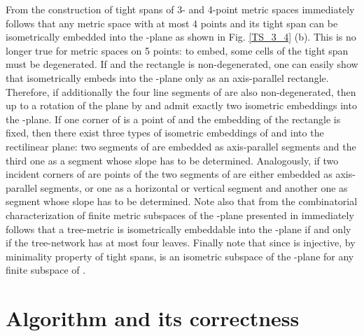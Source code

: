 \documentclass[11pt]{amsart}
\begin{document}
From the construction of tight spans of 3- and 4-point metric spaces
immediately follows that any metric space  with at most 4
points and its tight span  can be isometrically
embedded into the -plane as shown in Fig. \ref{TS_3_4} (b). This is
no longer true for metric spaces on 5 points:
to embed, some cells of the tight span must be degenerated. If
 and the rectangle  is non-degenerated, one can easily
show that  isometrically embeds  into the -plane only as
an axis-parallel rectangle. Therefore, if additionally the four line
segments of  are also non-degenerated, then up to a rotation
of the plane by   and   admit exactly two
isometric embeddings into the -plane. If one corner of 
is a point of   and the embedding of the rectangle  is
fixed, then there exist three types of isometric embeddings of 
and  into the rectilinear plane: two segments of  are
embedded as axis-parallel segments and the third one as a segment
whose slope has to be determined. Analogously, if two incident
corners of  are points of  the two segments of  are
either embedded as axis-parallel segments, or one as a horizontal or
vertical segment and another one as segment whose slope has to be
determined. Note also that from the combinatorial characterization
of finite metric subspaces of the -plane presented in
\cite{BaCh_six} immediately follows that a tree-metric  is
isometrically embeddable into the -plane if and only if the
tree-network  has at most four leaves. Finally note that since
 is injective, by minimality property of tight
spans,  is an isometric subspace of the -plane for any
finite subspace  of .


\section{Algorithm and its correctness}
\end{document}
